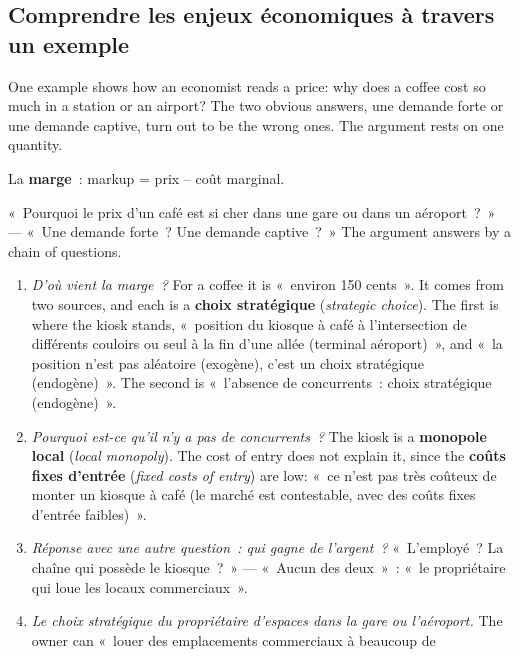 \subsection{Comprendre les enjeux économiques à travers un exemple}

One example shows how an economist reads a price: why does a coffee cost so much
in a station or an airport? The two obvious answers, une demande forte or une
demande captive, turn out to be the wrong ones. The argument rests on one quantity.

\begin{definition}
  La \textbf{marge}~: markup = prix – coût marginal.
\end{definition}

\begin{example}
  «~Pourquoi le prix d'un café est si cher dans une gare ou dans un aéroport~?~»
  --- «~Une demande forte~? Une demande captive~?~» The argument answers by a chain
  of questions.
  \begin{enumerate}
    \item \emph{D'où vient la marge~?} For a coffee it is «~environ 150 cents~».
      It comes from two sources, and each is a \textbf{choix stratégique}
      (\textit{strategic choice}). The first is where the kiosk stands,
      «~position du kiosque à café à l'intersection de différents couloirs ou seul
      à la fin d'une allée (terminal aéroport)~», and «~la position n'est pas
      aléatoire (exogène), c'est un choix stratégique (endogène)~». The second is
      «~l'absence de concurrents~: choix stratégique (endogène)~».
    \item \emph{Pourquoi est-ce qu'il n'y a pas de concurrents~?} The kiosk is a
      \textbf{monopole local} (\textit{local monopoly}). The cost of
      entry does not explain it, since the \textbf{coûts fixes d'entrée}
      (\textit{fixed costs of entry}) are low: «~ce n'est pas très coûteux de
      monter un kiosque à café (le marché est contestable, avec des coûts fixes
      d'entrée faibles)~».
    \item \emph{Réponse avec une autre question~: qui gagne de l'argent~?}
      «~L'employé~? La chaîne qui possède le kiosque~?~» --- «~Aucun des deux~»~:
      «~le propriétaire qui loue les locaux commerciaux~».
    \item \emph{Le choix stratégique du propriétaire d'espaces dans la gare ou
      l'aéroport.} The owner can «~louer des emplacements commerciaux à beaucoup de

\end{enumerate}
\end{example}
